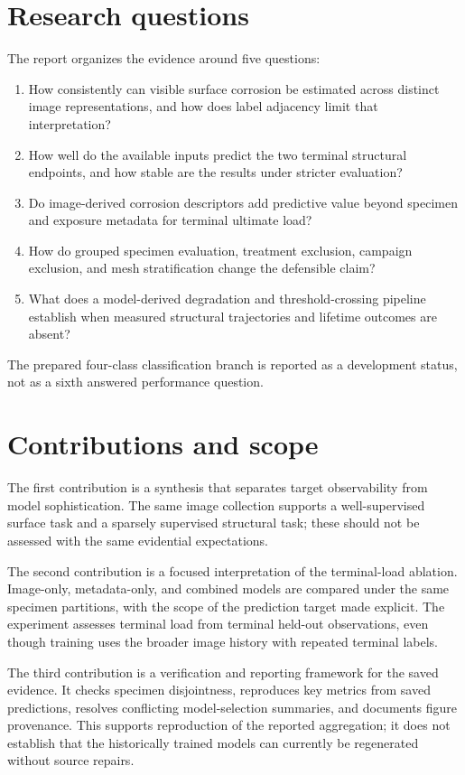 \section{Research questions}
The report organizes the evidence around five questions:
\begin{enumerate}[label=\textbf{RQ\arabic*.}]
\item How consistently can visible surface corrosion be estimated across distinct image representations, and how does label adjacency limit that interpretation?
\item How well do the available inputs predict the two terminal structural endpoints, and how stable are the results under stricter evaluation?
\item Do image-derived corrosion descriptors add predictive value beyond specimen and exposure metadata for terminal ultimate load?
\item How do grouped specimen evaluation, treatment exclusion, campaign exclusion, and mesh stratification change the defensible claim?
\item What does a model-derived degradation and threshold-crossing pipeline establish when measured structural trajectories and lifetime outcomes are absent?
\end{enumerate}
The prepared four-class classification branch is reported as a development status, not as a sixth answered performance question.

\section{Contributions and scope}
The first contribution is a synthesis that separates target observability from model sophistication. The same image collection supports a well-supervised surface task and a sparsely supervised structural task; these should not be assessed with the same evidential expectations.

The second contribution is a focused interpretation of the terminal-load ablation. Image-only, metadata-only, and combined models are compared under the same specimen partitions, with the scope of the prediction target made explicit. The experiment assesses terminal load from terminal held-out observations, even though training uses the broader image history with repeated terminal labels.

The third contribution is a verification and reporting framework for the saved evidence. It checks specimen disjointness, reproduces key metrics from saved predictions, resolves conflicting model-selection summaries, and documents figure provenance. This supports reproduction of the reported aggregation; it does not establish that the historically trained models can currently be regenerated without source repairs.

